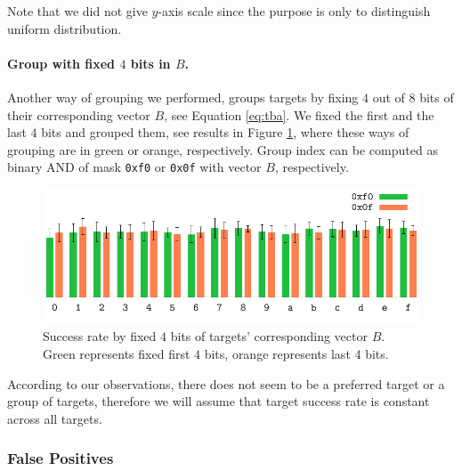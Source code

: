 	Note that we did not give $y$-axis scale since the purpose is only to distinguish uniform distribution.
	
	\paragraph{Group with fixed $4$ bits in $B$.}
	
	Another way of grouping we performed, groups targets by fixing $4$ out of $8$ bits of their corresponding vector $B$, see Equation \ref{eq:tba}. We fixed the first and the last $4$ bits and grouped them, see results in Figure \ref{fig:leaktargetotherhist}, where these ways of grouping are in green or orange, respectively. Group index can be computed as binary AND of mask {\tt 0xf0} or {\tt 0x0f} with vector $B$, respectively.
	
	\begin{figure}[h]
	\begin{center}
		\includegraphics{figures/leak_target_other/leak_0x0f_0xf0.pdf}
		\caption{Success rate by fixed $4$ bits of targets' corresponding vector $B$. Green represents fixed first $4$ bits, orange represents last $4$ bits.}
		\label{fig:leaktargetotherhist}
	\end{center}
	\end{figure}
	
	\begin{remark}
	\label{rem:uniform}
		According to our observations, there does not seem to be a preferred target or a group of targets, therefore we will assume that target success rate is constant across all targets.
	\end{remark}

\subsubsection{False Positives}
	
